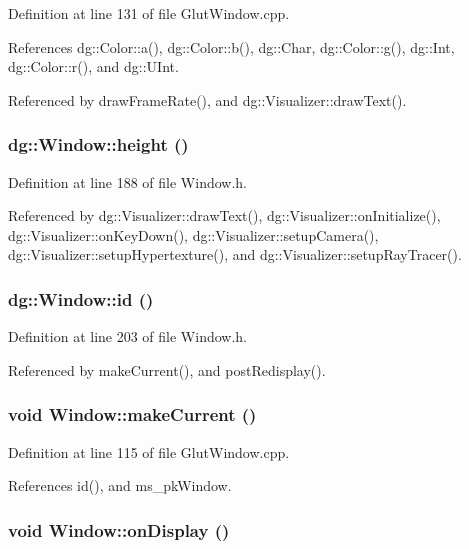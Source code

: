 Definition at line 131 of file Glut\-Window.cpp.

References dg::Color::a(), dg::Color::b(), dg::Char, dg::Color::g(), dg::Int, dg::Color::r(), and dg::UInt.

Referenced by draw\-Frame\-Rate(), and dg::Visualizer::draw\-Text().
\subsubsection{ dg::Window::height ()\hspace{0.3cm}{\tt  [inline]}}\label{classdg_1_1Window_a28}




Definition at line 188 of file Window.h.

Referenced by dg::Visualizer::draw\-Text(), dg::Visualizer::on\-Initialize(), dg::Visualizer::on\-Key\-Down(), dg::Visualizer::setup\-Camera(), dg::Visualizer::setup\-Hypertexture(), and dg::Visualizer::setup\-Ray\-Tracer().
\subsubsection{ dg::Window::id ()\hspace{0.3cm}{\tt  [inline]}}\label{classdg_1_1Window_a32}




Definition at line 203 of file Window.h.

Referenced by make\-Current(), and post\-Redisplay().
\subsubsection{\setlength{\rightskip}{0pt plus 5cm}void Window::make\-Current ()}\label{classdg_1_1Window_a23}




Definition at line 115 of file Glut\-Window.cpp.

References id(), and ms\_\-pk\-Window.
\subsubsection{\setlength{\rightskip}{0pt plus 5cm}void Window::on\-Display ()\hspace{0.3cm}{\tt  [virtual]}}\label{classdg_1_1Window_a7}




